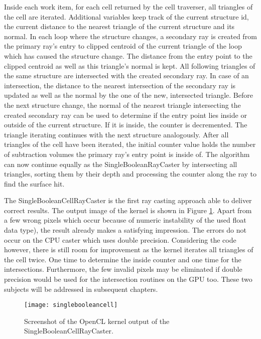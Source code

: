 Inside each work item, for each cell returned by the cell traverser, all triangles of the cell are iterated. Additional variables keep track of the current structure id, the current distance to the nearest triangle of the current structure and its normal. In each loop where the structure changes, a secondary ray is created from the primary ray's entry to clipped centroid of the current triangle of the loop which has caused the structure change. The distance from the entry point to the clipped centroid as well as this triangle's normal is kept. All following triangles of the same structure are intersected with the created secondary ray. In case of an intersection, the distance to the nearest intersection of the secondary ray is updated as well as the normal by the one of the new, intersected triangle. Before the next structure change, the normal of the nearest triangle intersecting the created secondary ray can be used to determine if the entry point lies inside or outside of the current structure. If it is inside, the counter is decremented. The triangle iterating continues with the next structure analogously. After all triangles of the cell have been iterated, the initial counter value holds the number of subtraction volumes the primary ray's entry point is inside of. The algorithm can now continue equally as the SingleBooleanRayCaster by intersecting all triangles, sorting them by their depth and processing the counter along the ray to find the surface hit.

The SingleBooleanCellRayCaster is the first ray casting approach able to deliver correct results. The output image of the kernel is shown in Figure \ref{fig:singlebooleancell}. Apart from a few wrong pixels which occur because of numeric instability of the used float data type), the result already makes a satisfying impression. The errors do not occur on the CPU caster which uses double precision. Considering the code however, there is still room for improvement as the kernel iterates all triangles of the cell twice. One time to determine the inside counter and one time for the intersections. Furthermore, the few invalid pixels may be eliminated if double precision would be used for the intersection routines on the GPU too. These two subjects will be addressed in subsequent chapters.

\begin{figure}
\centering
\texttt{[image: singlebooleancell]}
\caption{Screenshot of the OpenCL kernel output of the SingleBooleanCellRayCaster.}
\label{fig:singlebooleancell}
\end{figure}

